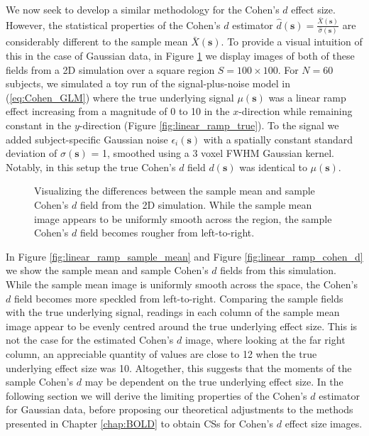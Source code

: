 We now seek to develop a similar methodology for the Cohen's $d$ effect size. However, the statistical properties of the Cohen's $d$ estimator $\hat{d}(\bm{s}) = \frac{\bar{X}(\bm{s})}{\hat{\sigma}(\bm{s})}$ are considerably different to the sample mean $\bar{X}(\bm{s})$. To provide a visual intuition of this in the case of Gaussian data, in Figure \ref{fig:visual_example} we display images of both of these fields from a 2D simulation over a square region $S = 100 \times 100$. For $N = 60$ subjects, we simulated a toy run of the signal-plus-noise model in (\ref{eq:Cohen_GLM}) where the true underlying signal $\mu(\bm{s})$ was a linear ramp effect increasing from a magnitude of 0 to 10 in the $x$-direction while remaining constant in the $y$-direction (Figure \ref{fig:linear_ramp_true}). To the signal we added subject-specific Gaussian noise $\epsilon_{i}(\bm{s})$ with a spatially constant standard deviation of $\sigma(\bm{s})$ = 1, 
smoothed using a 3 voxel FWHM Gaussian kernel. Notably, in this setup the true Cohen's $d$ field $d(\bm{s})$ was identical to $\mu(\bm{s})$.
\begin{figure}[htbp]
  \centering

  \hspace{1em}
  \caption{Visualizing the differences between the sample mean and sample Cohen's $d$ field from the 2D simulation. While the sample mean image appears to be uniformly smooth across the region, the sample Cohen's $d$ field becomes rougher from left-to-right.}
\label{fig:visual_example}
\end{figure}

In Figure \ref{fig:linear_ramp_sample_mean} and Figure \ref{fig:linear_ramp_cohen_d} we show the sample mean and sample Cohen's $d$ fields from this simulation. While the sample mean image is uniformly smooth across the space, the Cohen's $d$ field becomes more speckled from left-to-right. Comparing the sample fields with the true underlying signal, readings in each column of the sample mean image appear to be evenly centred around the true underlying effect size. This is not the case for the estimated Cohen's $d$ image, where looking at the far right column, an appreciable quantity of values are close to 12 when the true underlying effect size was 10. Altogether, this suggests that the moments of the sample Cohen's $d$ may be dependent on the true underlying effect size. In the following section we will derive the limiting properties of the Cohen's $d$ estimator for Gaussian data, before proposing our theoretical adjustments to the methods presented in Chapter \ref{chap:BOLD} to obtain CSs for Cohen's $d$ effect size images. 


